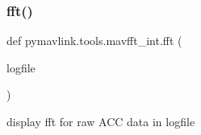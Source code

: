 \subsubsection{\texorpdfstring{fft()}{fft()}}
{\footnotesize\ttfamily def pymavlink.\+tools.\+mavfft\+\_\+int.\+fft (\begin{DoxyParamCaption}\item[{}]{logfile }\end{DoxyParamCaption})}

\begin{DoxyVerb}display fft for raw ACC data in logfile\end{DoxyVerb}
 
